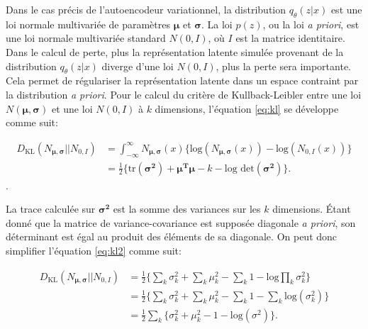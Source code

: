 Dans le cas précis de l'autoencodeur variationnel, la distribution $q_{\theta}(z|x)$ est une loi normale multivariée de paramètres $\boldsymbol \mu$ et $\boldsymbol \sigma$. La loi $p(z)$, ou la loi \textit{a priori}, est une loi normale multivariée standard $N(0,I)$, où $I$ est la matrice identitaire. Dans le calcul de perte, plus la représentation latente simulée provenant de la distribution $q_{\theta}(z|x)$ diverge d'une loi $N(0, I)$, plus la perte sera importante. Cela permet de régulariser la représentation latente dans un espace contraint par la distribution \textit{a priori}. Pour le calcul du critère de Kullback-Leibler entre une loi $N(\boldsymbol \mu, \boldsymbol \sigma)$ et une loi $N(0, I)$ à $k$ dimensions, l'équation \ref{eq:kl} se développe comme suit:

\begin{equation}  \label{eq:kl2}
	\begin{aligned}
	D_{\text{KL}}(N_{\boldsymbol \mu, \boldsymbol \sigma} || N_{0,I}) &= \int_{-\infty}^{\infty} N_{\boldsymbol \mu, \boldsymbol \sigma}(x) \big\{\text{log}(N_{\boldsymbol \mu,\boldsymbol \sigma}(x)) - \text{log}(N_{0,I}(x))\big\} \\
		&= \frac{1}{2}\big\{\text{tr}(\boldsymbol{\sigma^2}) + \boldsymbol{\mu^T} \boldsymbol{\mu} - k - \text{log det}(\boldsymbol{\sigma^2})\big \}.
 	\end{aligned}
\end{equation}.

La trace calculée sur $\boldsymbol{\sigma^2}$ est la somme des variances sur les $k$ dimensions. Étant donné que la matrice de variance-covariance est supposée diagonale \textit{a priori}, son déterminant est égal au produit des éléments de sa diagonale. On peut donc simplifier l'équation \ref{eq:kl2} comme suit:

\begin{equation}  \label{eq:kl3}
\begin{aligned}
D_{\text{KL}}(N_{\boldsymbol \mu, \boldsymbol \sigma} || N_{0,I}) &=  \frac{1}{2}\Big\{\sum_k \sigma_{k}^2+ \sum_{k}\mu_{k}^2 - \sum_{k} 1 - \text{log} \prod_{k}\sigma_{k}^2\Big \} \\
&=\frac{1}{2}\Big\{\sum_k \sigma_{k}^2+ \sum_{k}\mu_{k}^2 - \sum_{k} 1 - \sum_{k} \text{log} (\sigma_{k}^2)\Big \} \\
&=\frac{1}{2} \sum_{k}\Big\{\sigma_{k}^2 + \mu_{k}^2 - 1 - \text{log}(\sigma^2)\Big\}.
\end{aligned}
\end{equation}

